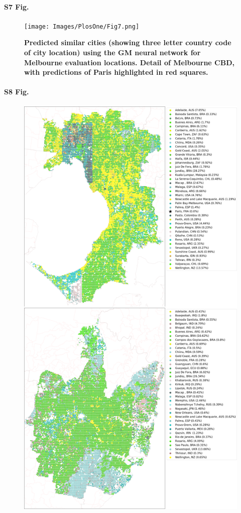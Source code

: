 \documentclass[10pt,letterpaper,hidelinks]{article}
\begin{document}
\paragraph*{S7 Fig.}
\begin{figure}[!htbp]
\centering     
\texttt{[image: Images/PlosOne/Fig7.png]} 
\caption{\bf Predicted similar cities (showing three letter country code of city location) using the GM neural network for Melbourne evaluation locations. Detail of Melbourne CBD, with predictions of Paris highlighted in red squares.}    
 \label{fig:melmapscbd}  
\end{figure} 

\paragraph*{S8 Fig.}
\begin{figure}[!htbp]
\centering    
\includegraphics[scale=0.16]{Images/PlosOne/Fig8.png} 

\end{figure}
\end{document}
